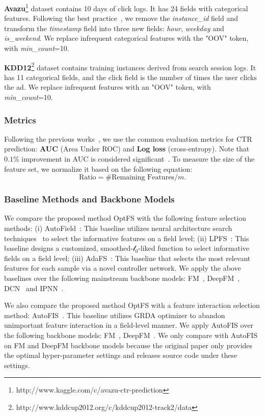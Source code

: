\documentclass[sigconf]{acmart}
\begin{document}
\textbf{Avazu}\footnote{http://www.kaggle.com/c/avazu-ctr-prediction} dataset contains 10 days of click logs. It has 24 fields with categorical features. Following the best practice~\cite{fuxictr}, we remove the \textit{instance\_id} field and transform the \textit{timestamp} field into three new fields: \textit{hour}, \textit{weekday} and \textit{is\_weekend}. We replace infrequent categorical features with the "OOV" token, with \textit{min\_count}=10.

\textbf{KDD12}\footnote{http://www.kddcup2012.org/c/kddcup2012-track2/data} dataset contains training instances derived from search session logs. It has 11 categorical fields, and the click field is the number of times the user clicks the ad. We replace infrequent features with an "OOV" token, with \textit{min\_count}=10.

\subsubsection{Metrics}
Following the previous works~\cite{FM,DeepFM}, we use the common evaluation metrics for CTR prediction: \textbf{AUC} (Area Under ROC) and \textbf{Log loss} (cross-entropy). Note that $\mathbf{0.1 \%}$ improvement in AUC is considered significant~\cite{IPNN, DeepFM}. To measure the size of the feature set, we normalize it based on the following equation:
\begin{equation}
\label{eq:ratio}
    \text{Ratio} = \text{\#Remaining Features}/m.
\end{equation}

\subsubsection{Baseline Methods and Backbone Models}
We compare the proposed method OptFS with the following feature selection methods: (i) AutoField~\cite{AutoField}: This baseline utilizes neural architecture search techniques~\cite{DARTS} to select the informative features on a field level; (ii) LPFS~\cite{LPFS}: This baseline designs a customized, smoothed-$\mathcal{l}_0$-liked function to select informative fields on a field level; (iii) AdaFS~\cite{AdaFS}: This baseline that selects the most relevant features for each sample via a novel controller network. We apply the above baselines over the following mainstream backbone models: FM~\cite{FM}, DeepFM~\cite{DeepFM}, DCN~\cite{DCN} and IPNN~\cite{IPNN}.

We also compare the proposed method OptFS with a feature interaction selection method: AutoFIS~\cite{AutoFIS}. This baseline utilizes GRDA optimizer to abandon unimportant feature interaction in a field-level manner. We apply AutoFIS over the following backbone models: FM~\cite{FM}, DeepFM~\cite{DeepFM}. We only compare with AutoFIS on FM and DeepFM backbone models because the original paper only provides the optimal hyper-parameter settings and releases source code under these settings.
\end{document}
